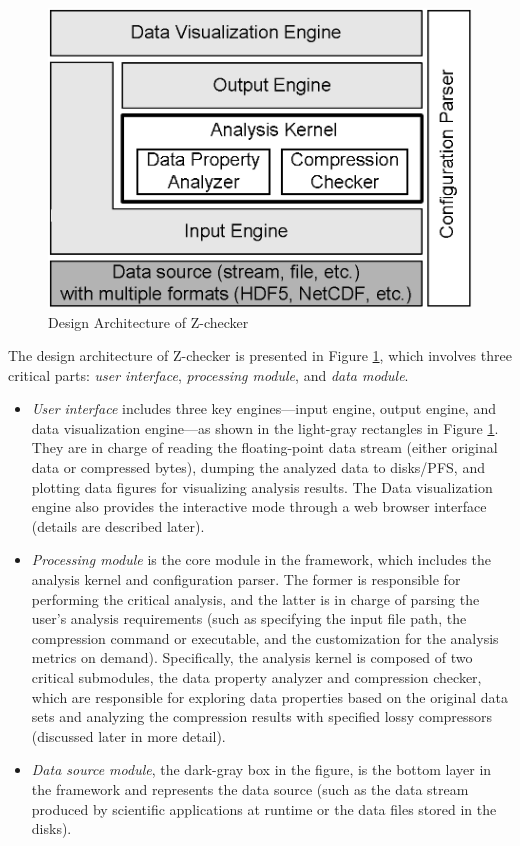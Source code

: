  \begin{figure}[ht] \centering
\includegraphics[scale=.6]{Figs/framework.eps}
\caption{Design Architecture of Z-checker}
\label{fig:framework}
\end{figure}

The design architecture of Z-checker is presented in Figure \ref{fig:framework}, which involves three critical parts: \emph{user interface},  \emph{processing module}, and \emph{data module}.
\begin{itemize}
\item \emph{User interface} includes three key engines---input engine, output engine, and data visualization engine---as shown in the light-gray rectangles in Figure \ref{fig:framework}. They are in charge of reading the floating-point data stream (either original data or compressed bytes), dumping the analyzed data to disks/PFS, and plotting data figures for visualizing analysis results. The Data visualization engine also provides the interactive mode through a web browser interface (details are described later).
\item \emph{Processing module} is the core module in the framework, which includes the analysis kernel and configuration parser. The former is responsible for performing the critical analysis, and the latter is in charge of parsing the user's analysis requirements (such as specifying the input file path, the compression command or executable, and the customization for the analysis metrics on demand). Specifically, the analysis kernel is composed of two critical submodules, the data property analyzer and compression checker, which are responsible for exploring data properties based on the original data sets and analyzing the compression results with specified lossy compressors (discussed later in more detail).
\item \emph{Data source module}, the dark-gray box in the figure, is the bottom layer in the framework and represents the data source (such as the data stream produced by scientific applications at runtime or the data files stored in the disks).
\end{itemize}

